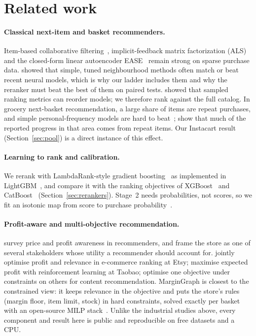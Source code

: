 \documentclass[11pt]{article}
\begin{document}
\section{Related work}

\paragraph{Classical next-item and basket recommenders.}
Item-based collaborative filtering~\citep{sarwar2001itemcf}, implicit-feedback matrix factorization (ALS)~\citep{hu2008implicit} and the closed-form linear autoencoder EASE~\citep{steck2019ease} remain strong on sparse purchase data.
\citet{dacrema2019progress} showed that simple, tuned neighbourhood methods often match or beat recent neural models, which is why our ladder includes them and why the reranker must beat the best of them on paired tests.
\citet{krichene2020sampled} showed that sampled ranking metrics can reorder models; we therefore rank against the full catalog.
In grocery next-basket recommendation, a large share of items are repeat purchases, and simple personal-frequency models are hard to beat~\citep{hu2020tifuknn}; \citet{li2023nbrreality} show that much of the reported progress in that area comes from repeat items.
Our Instacart result (Section~\ref{sec:pool}) is a direct instance of this effect.

\paragraph{Learning to rank and calibration.}
We rerank with LambdaRank-style gradient boosting~\citep{burges2010lambdamart} as implemented in LightGBM~\citep{ke2017lightgbm}, and compare it with the ranking objectives of XGBoost~\citep{chen2016xgboost} and CatBoost~\citep{prokhorenkova2018catboost} (Section~\ref{sec:rerankers}).
Stage~2 needs probabilities, not scores, so we fit an isotonic map from score to purchase probability~\citep{zadrozny2002calibration}.

\paragraph{Profit-aware and multi-objective recommendation.}
\citet{jannach2017price} survey price and profit awareness in recommenders, and \citet{abdollahpouri2020multistakeholder} frame the store as one of several stakeholders whose utility a recommender should account for.
\citet{louca2019profit} jointly optimise profit and relevance in e-commerce ranking at Etsy; \citet{pei2019value} maximise expected profit with reinforcement learning at Taobao; \citet{agarwal2011clickshaping} optimise one objective under constraints on others for content recommendation.
MarginGraph is closest to the constrained view: it keeps relevance in the objective and puts the store's rules (margin floor, item limit, stock) in hard constraints, solved exactly per basket with an open-source MILP stack~\citep{mitchell2011pulp,huangfu2018highs}.
Unlike the industrial studies above, every component and result here is public and reproducible on free datasets and a CPU.
\end{document}
